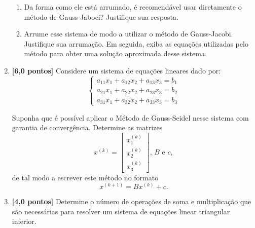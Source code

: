 \documentclass[12pt,a4paper]{article}
\begin{document}
\begin{enumerate}
  \begin{enumerate}
   \item Da forma como ele está arrumado, é recomendável usar diretamente o método de Gauss-Jaboci? Justifique sua resposta.
   \item Arrume esse sistema de modo a utilizar o método de Gauss-Jacobi. Justifique sua arrumação. Em seguida, exiba as equações 
         utilizadas pelo método para obter uma solução aproximada desse sistema.
  \end{enumerate}

 \item \textbf{[6,0 pontos]} Considere um sistema de equações lineares dado por:
$$\begin{cases}
   a_{11}x_1 + a_{12}x_2 + a_{13}x_3 = b_1 \\
   a_{21}x_1 + a_{22}x_2 + a_{23}x_3 = b_2 \\
   a_{31}x_1 + a_{32}x_2 + a_{33}x_3 = b_3
  \end{cases}
$$

Suponha que é possível aplicar o Método de Gauss-Seidel nesse sistema com garantia de convergência. Determine as matrizes 
$$x^{(k)} = \begin{bmatrix} x^{(k)}_1 \\ x^{(k)}_2 \\ x^{(k)}_3\end{bmatrix}, \,B \textrm{ e } c,$$ 
de tal modo a escrever este método no formato $$x^{(k+1)} = Bx^{(k)} + c.$$

 \item \textbf{[4,0 pontos]} Determine o número de operações de soma e multiplicação que são necessárias para resolver 
um sistema de equações linear triangular inferior.

\end{enumerate}
\end{document}
